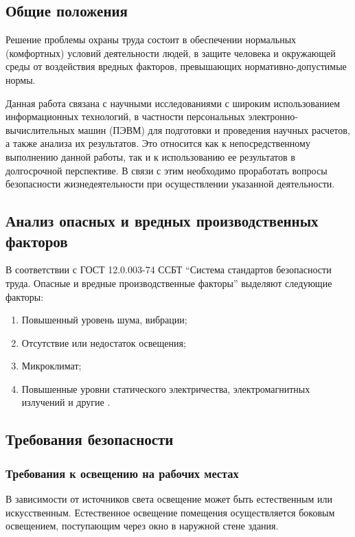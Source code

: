 \subsection{Общие положения}
Решение проблемы охраны труда состоит в обеспечении нормальных (комфортных) условий деятельности людей, в защите человека и окружающей среды от воздействия вредных факторов, превышающих нормативно-допустимые нормы.

Данная работа связана с научными исследованиями с широким использованием информационных технологий, в частности персональных электронно-вычислительных машин (ПЭВМ) для подготовки и проведения научных расчетов, а также анализа их результатов. Это относится как к непосредственному выполнению данной работы, так и к использованию ее результатов в долгосрочной перспективе. В связи с этим необходимо проработать вопросы безопасности жизнедеятельности при осуществлении указанной деятельности.

\subsection{Анализ опасных и вредных производственных факторов}
В соответствии с ГОСТ 12.0.003-74 ССБТ ``Система стандартов безопасности труда. Опасные и вредные производственные факторы'' выделяют следующие факторы:

\begin{enumerate}
  \item Повышенный уровень шума, вибрации;
  \item Отсутствие или недостаток освещения;
  \item Микроклимат;
  \item Повышенные уровни статического электричества, электромагнитных излучений и другие \cite{bhzd_1}.
\end{enumerate}

\subsection{Требования безопасности}
\subsubsection{Требования к освещению на рабочих местах}

В зависимости от источников света освещение может быть естественным или искусственным. Естественное освещение помещения осуществляется боковым освещением, поступающим через окно в наружной стене здания.

